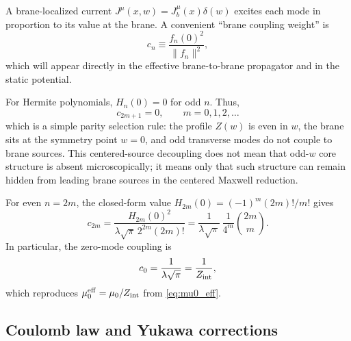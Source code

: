 \documentclass[11pt]{article}
\newcommand{\J}{J}
\newcommand{\Z}{Z}
\newcommand{\lam}{\lambda}      %
\newcommand{\Zint}{Z_{\rm int}} %
\newcommand{\muo}{\mu_0}
\newcommand{\mueff}{\mu_0^{\rm eff}}
\begin{document}
A brane-localized current \(\J^\mu(x,w)=\J_b^\mu(x)\delta(w)\) excites each mode in
proportion to its value at the brane. A convenient ``brane coupling weight'' is
\begin{equation}
  c_n \equiv \frac{f_n(0)^2}{\|f_n\|^2},
  \label{eq:cn_def}
\end{equation}
which will appear directly in the effective brane-to-brane propagator and in the
static potential.

For Hermite polynomials, \(H_n(0)=0\) for odd \(n\). Thus,
\begin{equation}
  c_{2m+1}=0,
  \qquad m=0,1,2,\ldots
  \label{eq:odd_vanish}
\end{equation}
which is a simple parity selection rule: the profile \(\Z(w)\) is even in \(w\),
the brane sits at the symmetry point \(w=0\), and odd transverse modes do not
couple to brane sources. This centered-source decoupling does not mean that
odd-\(w\) core structure is absent microscopically; it means only that such
structure can remain hidden from leading brane sources in the centered Maxwell
reduction.

For even \(n=2m\), the closed-form value \(H_{2m}(0)=(-1)^m(2m)!/m!\) gives
\begin{equation}
  c_{2m}
  = \frac{H_{2m}(0)^2}{\lam\sqrt{\pi}\,2^{2m}(2m)!}
  = \frac{1}{\lam\sqrt{\pi}}\,
    \frac{1}{4^m}\binom{2m}{m}.
  \label{eq:cn_even_closed}
\end{equation}
In particular, the zero-mode coupling is
\begin{equation}
  c_0 = \frac{1}{\lam\sqrt{\pi}} = \frac{1}{\Zint},
\end{equation}
which reproduces \(\mueff=\muo/\Zint\) from \cref{eq:mu0_eff}.

\subsection{Coulomb law and Yukawa corrections}
\label{sec:yukawa}
\end{document}
